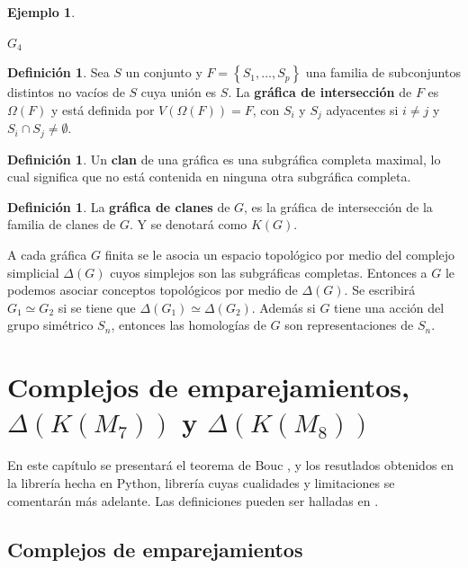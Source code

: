 \documentclass[12pt]{book}
\theoremstyle{definition}
\newtheorem{definition}[theorem]{Definición}
\newtheorem{example}[theorem]{Ejemplo}
\newcounter{in}
\newcounter{ini}
\begin{document}
\begin{example}
\begin{center}
\begin{minipage}{0.26\linewidth}
      $G_{4}$
    \end{minipage}
  \end{center}
\end{example}


\begin{definition}
  \label{intersection_graph}
  Sea $S$ un conjunto y $F = \left\{ S_{1}, \ldots, S_{p} \right\}$
  una familia de subconjuntos distintos no vacíos de $S$ cuya unión es
  $S$. La \textbf{gráfica de intersección} de $F$ es $\Omega(F)$ y
  está definida por $V(\Omega(F)) = F$, con $S_{i}$ y $S_{j}$
  adyacentes si $i \neq j$ y $S_{i} \cap S_{j} \neq \emptyset$.
\end{definition}

\begin{definition}
  \label{clique}
  Un \textbf{clan} de una gráfica es una subgráfica completa maximal,
  lo cual significa que no está contenida en ninguna otra subgráfica
  completa.
\end{definition}


\begin{definition}
  \label{clique_graph}
  La \textbf{gráfica de clanes} de $G$, es la gráfica de intersección
  de la familia de clanes de $G$. Y se denotará como $K(G)$.
\end{definition}

A cada gráfica $G$ finita se le asocia un espacio topológico por medio
del complejo simplicial $\Delta(G)$ cuyos simplejos son las
subgráficas completas. Entonces a $G$ le podemos asociar conceptos
topológicos por medio de $\Delta(G)$. Se escribirá
$G_{1} \simeq G_{2}$ si se tiene que
$\Delta(G_{1}) \simeq \Delta(G_{2})$.  Además si $G$ tiene una acción
del grupo simétrico $S_{n}$, entonces las homologías de $G$ son
representaciones de $S_{n}$.

\chapter{Complejos de emparejamientos, $\Delta(K(M_7))$ y $\Delta(K(M_8))$}
\label{hom_ce_cc}
En este capítulo se presentará el teorema de Bouc
\cite{dong2002combinatorial}, y los resutlados obtenidos en la
librería hecha en Python, librería cuyas cualidades y limitaciones se
comentarán más adelante. Las definiciones pueden ser halladas en
\cite{larrion2008equivariant}.

\section{Complejos de emparejamientos}
\label{c_em}
\end{document}
